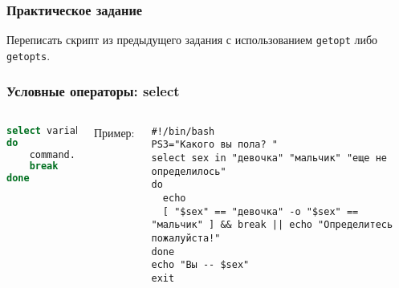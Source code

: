 \begin{frame}
\frametitle{Практическое задание}
Переписать скрипт из предыдущего задания с использованием {\tt getopt} либо {\tt getopts}.
\end{frame}

\begin{frame}[fragile]
\frametitle{Условные операторы: select}

	\small
	\begin{columns}

		\begin{lstlisting}[language=sh,frame=single]
select variable [in list]
do
	command...
	break
done 
		\end{lstlisting}
		\pause
		{\normalsize Пример:}

		\begin{lstlisting}
#!/bin/bash
PS3="Какого вы пола? "
select sex in "девочка" "мальчик" "еще не определилось"
do
  echo
  [ "$sex" == "девочка" -o "$sex" == "мальчик" ] && break || echo "Определитесь пожалуйста!"
done
echo "Вы -- $sex"
exit
		\end{lstlisting}

		\pause

	\end{columns}
\end{frame}


